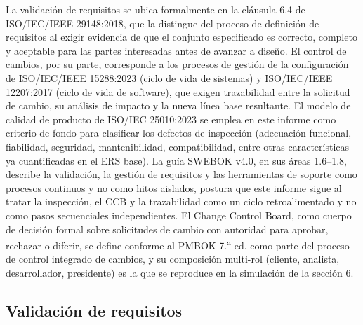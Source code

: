 \documentclass[11pt,a4paper]{article}
\begin{document}
La validación de requisitos se ubica formalmente en la cláusula 6.4 de
ISO/IEC/IEEE 29148:2018, que la distingue del proceso de definición de requisitos al exigir
evidencia de que el conjunto especificado es correcto, completo y aceptable para las partes
interesadas antes de avanzar a diseño. El control de cambios, por su parte, corresponde a los
procesos de gestión de la configuración de ISO/IEC/IEEE 15288:2023 (ciclo de vida de sistemas) y
ISO/IEC/IEEE 12207:2017 (ciclo de vida de software), que exigen trazabilidad entre la solicitud
de cambio, su análisis de impacto y la nueva línea base resultante. El modelo de calidad de
producto de ISO/IEC 25010:2023 se emplea en este informe como criterio de fondo para clasificar
los defectos de inspección (adecuación funcional, fiabilidad, seguridad, mantenibilidad,
compatibilidad, entre otras características ya cuantificadas en el ERS base). La guía
SWEBOK v4.0, en sus áreas 1.6--1.8, describe la validación, la gestión de requisitos y las
herramientas de soporte como procesos continuos y no como hitos aislados, postura que este
informe sigue al tratar la inspección, el CCB y la trazabilidad como un ciclo retroalimentado y
no como pasos secuenciales independientes. El Change Control Board, como cuerpo de decisión
formal sobre solicitudes de cambio con autoridad para aprobar, rechazar o diferir, se define
conforme al PMBOK 7.\textsuperscript{a} ed. como parte del proceso de control integrado de
cambios, y su composición multi-rol (cliente, analista, desarrollador, presidente) es la que se
reproduce en la simulación de la sección 6.

\subsection{Validación de requisitos}
\end{document}
